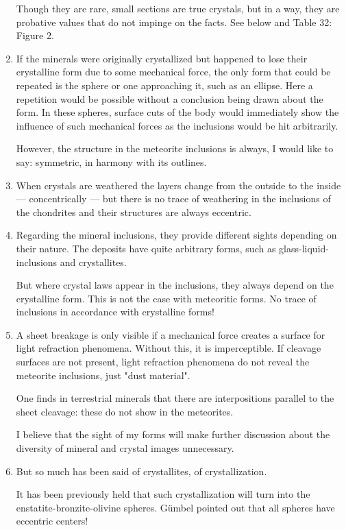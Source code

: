 \documentclass[a4paper, 12pt, oneside]{article}
\begin{document}
\begin{enumerate}
    Though they are rare, small sections are true crystals, but in a way, they are probative values that do not impinge on the facts. See below and Table 32: Figure 2.
    \item If the minerals were originally crystallized but happened to lose their crystalline form due to some mechanical force, the only form that could be repeated is the sphere or one approaching it, such as an ellipse. Here a repetition would be possible without a conclusion being drawn about the form. In these spheres, surface cuts of the body would immediately show the influence of such mechanical forces as the inclusions would be hit arbitrarily.
    
    However, the structure in the meteorite inclusions is always, I would like to say: symmetric, in harmony with its outlines.
    \item When crystals are weathered the layers change from the outside to the inside — concentrically — but there is no trace of weathering in the inclusions of the chondrites and their structures are always eccentric.
    \item Regarding the mineral inclusions, they provide different sights depending on their nature. The deposits have quite arbitrary forms, such as glass-liquid-inclusions and crystallites.
    
    But where crystal laws appear in the inclusions, they always depend on the crystalline form. This is not the case with meteoritic forms. No trace of inclusions in accordance with crystalline forms!
    \item A sheet breakage is only visible if a mechanical force creates a surface for light refraction phenomena. Without this, it is imperceptible. If cleavage surfaces are not present, light refraction phenomena do not reveal the meteorite inclusions, just "dust material".
    
    One finds in terrestrial minerals that there are interpositions parallel to the sheet cleavage: these do not show in the meteorites.
    
    I believe that the sight of my forms will make further discussion about the diversity of mineral and crystal images unnecessary.
    \item But so much has been said of crystallites, of crystallization.
    
    It has been previously held that such crystallization will turn into the enstatite-bronzite-olivine spheres. Gümbel pointed out that all spheres have eccentric centers!
    

\end{enumerate}
\end{document}
